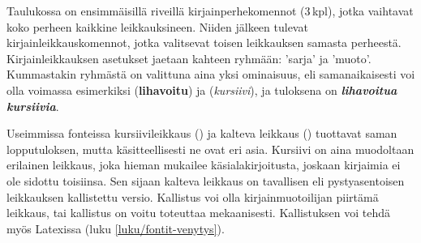
Taulukossa on ensimmäisillä riveillä kirjainperhekomennot (3\,kpl),
jotka vaihtavat koko perheen kaikkine leikkauksineen. Niiden jälkeen
tulevat kirjainleikkauskomennot, jotka valitsevat toisen leikkauksen
samasta perheestä. Kirjainleikkauksen asetukset jaetaan kahteen ryhmään:
 'sarja' ja  'muoto'. Kummastakin
ryhmästä on valittuna aina yksi ominaisuus, eli samanaikaisesti voi olla
voimassa esimerkiksi  (\textbf{lihavoitu}) ja
 (\textit{kursiivi}), ja tuloksena on \textbf{\itshape
  lihavoitua kursiivia}.

Useimmissa fonteissa kursiivileikkaus () ja kalteva
leikkaus () tuottavat saman lopputuloksen, mutta
käsitteellisesti ne ovat eri asia. Kursiivi on aina muodoltaan erilainen
leikkaus, joka hieman mukailee käsialakirjoitusta, joskaan kirjaimia ei
ole sidottu toisiinsa. Sen sijaan kalteva leikkaus on tavallisen eli
pystyasentoisen leikkauksen kallistettu versio. Kallistus voi olla
kirjainmuotoilijan piirtämä leikkaus, tai kallistus on voitu toteuttaa
mekaanisesti. Kallistuksen voi tehdä myös Latexissa (luku
\ref{luku/fontit-venytys}).

